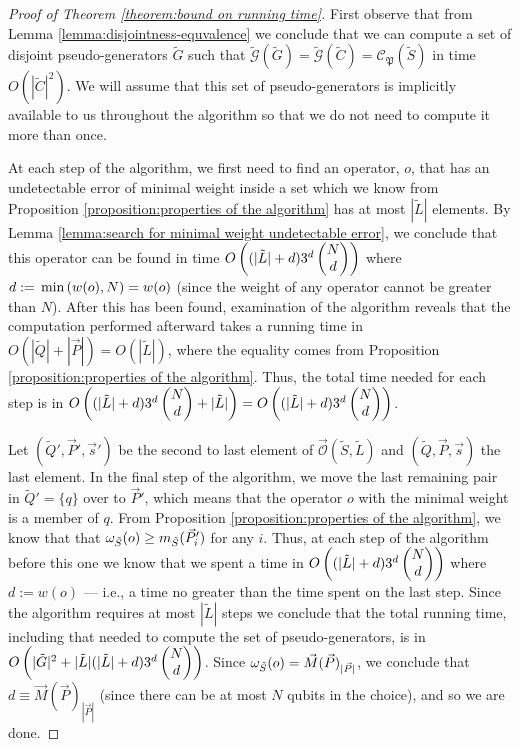\documentclass[twocolumn,showpacs,preprintnumbers,amsmath,amssymb,nofootinbib,pra,floatfix]{revtex4-1}
\newcommand{\lst}{\vec}
\newcommand{\set}{\tilde}
\newcommand{\genfun}{\tilde{\mathcal{G}}}
\newcommand{\pauligroup}{\mathfrak{P}}
\newcommand{\centralizer}{\mathcal{C}}
\newcommand{\optimizer}{\lst{\mathcal{O}}}
\begin{document}
\begin{proof}[Proof of Theorem \ref{theorem:bound on running time}]
First observe that from Lemma \ref{lemma:disjointness-equvalence} we conclude that we can compute a set of disjoint pseudo-generators $\set G$ such that $\genfun(\set G)=\genfun(\set C)=\centralizer_\pauligroup(\set S)$ in time $O(|\set C|^2)$.  We will assume that this set of pseudo-generators is implicitly available to us throughout the algorithm so that we do not need to compute it more than once.

At each step of the algorithm, we first need to find an operator, $o$, that has an undetectable error of minimal weight inside a set which we know from Proposition \ref {proposition:properties of the algorithm} has at most $|\set L|$ elements.  By Lemma \ref{lemma:search for minimal weight undetectable error}, we conclude that this operator can be found in time $O\paren{(|\set L|+d)3^d\choose{N}{d}}$ where $d:=\,\text{min}\left(w(o),N\right)=w(o)$ (since the weight of any operator cannot be greater than $N$).  After this has been found, examination of the algorithm reveals that the computation performed afterward takes a running time in $O(|\set Q|+|\lst P|)=O(|\set L|)$, where the equality comes from Proposition \ref {proposition:properties of the algorithm}.  Thus, the total time needed for each step is in $O\paren{(|\set L|+d)3^d\choose{N}{d}+|\set L|}=O\paren{(|\set L|+d)3^d\choose{N}{d}}$.

Let $(\set Q',\lst P',\lst s')$ be the second to last element of $\optimizer(\set S,\set L)$ and $(\set Q,\lst P,\lst s)$ the last element.  In the final step of the algorithm, we move the last remaining pair in $\set Q'=\{q\}$ over to $\lst P'$, which means that the operator $o$ with the minimal weight is a member of $q$.  From Proposition \ref {proposition:properties of the algorithm}, we know that that $\om_{\set S}(o)\ge m_{\set S}(\lst P'_i)$ for any $i$.  Thus, at each step of the algorithm before this one we know that we spent a time in $O\paren{(|\set L|+d)3^d\choose{N}{d}}$ where $d:=w(o)$ --- i.e., a time no greater than the time spent on the last step.  Since the algorithm requires at most $|\set L|$ steps we conclude that the total running time, including that needed to compute the set of pseudo-generators, is in $O\paren{|\set G|^2+|\set L|(|\set L|+d)3^d\choose{N}{d}}$.  Since $\om_{\set S}(o)=\lst M(\lst P)_{|\lst P|}$, we conclude that $d\equiv\lst M(\lst P)_{|\lst P|}$ (since there can be at most $N$ qubits in the choice), and so we are done.
\end{proof}
\end{document}

